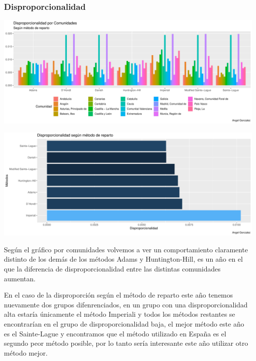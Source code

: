 \documentclass[12pt,a4paper,]{book}
\numberwithin{dummy}{section}
\theoremstyle{ocrenumbox}
\theoremstyle{blacknumex}
\theoremstyle{blacknumbox}
\theoremstyle{ocrenum}
\theoremstyle{ocrenum}
\begin{document}
\hypertarget{disproporcionalidad-11}{%
\subsubsection{Disproporcionalidad}\label{disproporcionalidad-11}}

\begin{center}\includegraphics[width=0.95\linewidth]{figurasR/unnamed-chunk-159-1} \end{center}

\begin{center}\includegraphics[width=0.95\linewidth]{figurasR/unnamed-chunk-159-2} \end{center}

Según el gráfico por comunidades volvemos a ver un comportamiento
claramente distinto de los demás de los métodos Adams y Huntington-Hill,
es un año en el que la diferencia de disproporcionalidad entre las
distintas comunidades aumentan.

En el caso de la disproporción según el método de reparto este año
tenemos nuevamente dos grupos difenrenciados, en un grupo con una
disproporcionalidad alta estaría únicamente el método Imperiali y todos
los métodos restantes se encontrarían en el grupo de disproporcionalidad
baja, el mejor método este año es el Sainte-Lague y encontramos que el
método utilizado en España es el segundo peor método posible, por lo
tanto sería interesante este año utilizar otro método mejor.
\end{document}
